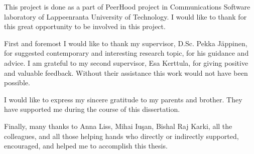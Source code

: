 %
%
This project is done as a part of \The PeerHood project in Communications Software laboratory of Lappeenranta University of Technology.
%
I would like to thank for this great opportunity to be involved in this project.

%
First and foremost I would like to thank my supervisor, D.Sc. Pekka J\"appinen, for suggested contemporary and interesting research topic, for his guidance and advice. 
%
I am grateful to my second supervisor, Esa Kerttula, for giving positive and valuable feedback. 
%
Without their assistance this work would not have been possible.

%
I would like to express my sincere gratitude to my parents and brother.
%
They have supported me during the course of this dissertation.

%
Finally, many thanks to Anna Liss, 
Mihai Iu\c{s}an, Bishal Raj Karki, all the colleagues, and all those helping hands who directly or indirectly supported, encouraged, and helped me to accomplish this thesis.